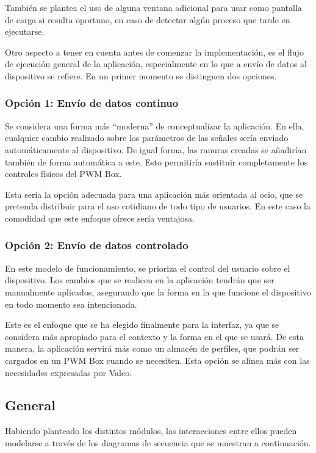 También se plantea el uso de alguna ventana adicional para usar como pantalla de carga si resulta oportuno, en caso de detectar algún proceso que tarde en ejecutarse.

Otro aspecto a tener en cuenta antes de comenzar la implementación, es el flujo de ejecución general de la aplicación, especialmente en lo que a envío de datos al dispositivo se refiere. En un primer momento se distinguen dos opciones.

\subsubsection{Opción 1: Envío de datos continuo}

Se considera una forma más ``moderna'' de conceptualizar la aplicación. En ella, cualquier cambio realizado sobre los parámetros de las señales sería enviado automáticamente al dispositivo. De igual forma, las ranuras creadas se añadirían también de forma automática a este. Esto permitiría sustituir completamente los controles físicos del PWM Box.

Esta sería la opción adecuada para una aplicación más orientada al ocio, que se pretenda distribuir para el uso cotidiano de todo tipo de usuarios. En este caso la comodidad que este enfoque ofrece sería ventajosa.

\subsubsection{Opción 2: Envío de datos controlado}

En este modelo de funcionamiento, se prioriza el control del usuario sobre el dispositivo. Los cambios que se realicen en la aplicación tendrán que ser manualmente aplicados, asegurando que la forma en la que funcione el dispositivo en todo momento sea intencionada.

Este es el enfoque que se ha elegido finalmente para la interfaz, ya que se considera más apropiado para el contexto y la forma en el que se usará. De esta manera, la aplicación servirá más como un almacén de perfiles, que podrán ser cargados en un PWM Box cuando se necesiten. Esta opción se alinea más con las necesidades expresadas por Valeo.

\subsection{General}

Habiendo planteado los distintos módulos, las interacciones entre ellos pueden modelarse a través de los diagramas de secuencia que se muestran a continuación.

